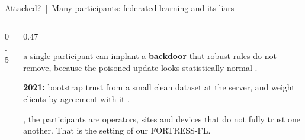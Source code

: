 \documentclass[aspectratio=169,10pt]{beamer}
\begin{document}
\begin{frame}{Attacked? \,|\, Many participants: federated learning and its liars}
\begin{columns}[T]
\begin{column}{0.5\textwidth}
\vspace{1mm}
\end{column}
\begin{column}{0.47\textwidth}
{\footnotesize {} a single participant can implant a \textbf{backdoor} that robust rules do not remove, because the poisoned update looks statistically normal .

\vspace{2mm}
\textbf{2021:} bootstrap trust from a small clean dataset at the server, and weight clients by agreement with it .

\vspace{2mm}
, the participants are operators, sites and devices that do not fully trust one another. That is the setting of our FORTRESS-FL.}
\end{column}
\end{columns}
\end{frame}
\end{document}
